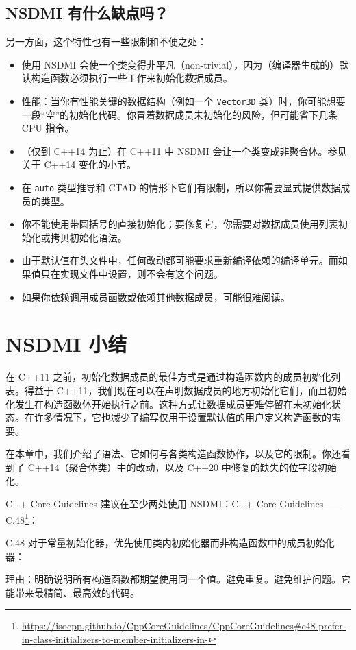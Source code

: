 \subsection{NSDMI 有什么缺点吗？}

另一方面，这个特性也有一些限制和不便之处：

\begin{itemize}
\item 使用 NSDMI 会使一个类变得非平凡（non-trivial），因为（编译器生成的）默认构造函数必须执行一些工作来初始化数据成员。
\item 性能：当你有性能关键的数据结构（例如一个 \texttt{Vector3D} 类）时，你可能想要一段“空”的初始化代码。你冒着数据成员未初始化的风险，但可能省下几条 CPU 指令。
\item （仅到 C++14 为止）在 C++11 中 NSDMI 会让一个类变成非聚合体。参见关于 C++14 变化的小节。
\item 在 \texttt{auto} 类型推导和 CTAD 的情形下它们有限制，所以你需要显式提供数据成员的类型。
\item 你不能使用带圆括号的直接初始化；要修复它，你需要对数据成员使用列表初始化或拷贝初始化语法。
\item 由于默认值在头文件中，任何改动都可能要求重新编译依赖的编译单元。而如果值只在实现文件中设置，则不会有这个问题。
\item 如果你依赖调用成员函数或依赖其他数据成员，可能很难阅读。
\end{itemize}

\section{NSDMI 小结}

在 C++11 之前，初始化数据成员的最佳方式是通过构造函数内的成员初始化列表。得益于 C++11，我们现在可以在声明数据成员的地方初始化它们，而且初始化发生在构造函数体开始执行之前。这种方式让数据成员更难停留在未初始化状态。在许多情况下，它也减少了编写仅用于设置默认值的用户定义构造函数的需要。

在本章中，我们介绍了语法、它如何与各类构造函数协作，以及它的限制。你还看到了 C++14（聚合体类）中的改动，以及 C++20 中修复的缺失的位字段初始化。

C++ Core Guidelines 建议在至少两处使用 NSDMI：C++ Core Guidelines——C.48\footnote{\url{https://isocpp.github.io/CppCoreGuidelines/CppCoreGuidelines\#c48-prefer-in-class-initializers-to-member-initializers-in-}}：

\begin{myQuote}
C.48 对于常量初始化器，优先使用类内初始化器而非构造函数中的成员初始化器：

理由：明确说明所有构造函数都期望使用同一个值。避免重复。避免维护问题。它能带来最精简、最高效的代码。
\end{myQuote}

